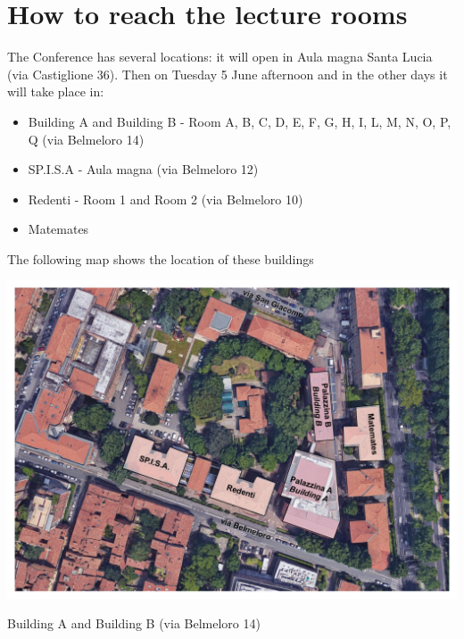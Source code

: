 \section*{How to reach the lecture rooms}

The Conference has several locations: it will open in Aula magna Santa Lucia (via Castiglione 36).
Then on Tuesday 5 June afternoon and in the other days it will take place in:

\begin{itemize}
\item Building A and Building B - Room A, B, C, D, E, F, G, H, I, L, M, N, O, P, Q (via Belmeloro 14)
\item SP.I.S.A - Aula magna (via Belmeloro 12)
\item Redenti - Room 1 and Room 2 (via Belmeloro 10)
\item Matemates
\end{itemize}

The following map shows the location of these buildings

\includegraphics[scale=0.4]{satellite.pdf}

\newpage

\begin{center}
Building A and Building B (via Belmeloro 14) 
\end{center}


